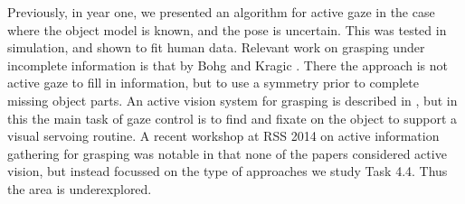 \documentclass[a4paper,11pt,pdf]{pacmanreport}
\begin{document}
Previously, in year one, we presented an algorithm for active gaze in the case where the object model is known, and the pose is uncertain. This was tested in simulation, and shown to fit human data. Relevant work on grasping under incomplete information is that by Bohg and Kragic \cite{bohg:icra11}. There the approach is not active gaze to fill in information, but to use a symmetry prior to complete missing object parts. An active vision system for grasping is described in \cite{gratal:irosws10}, but in this the main task of gaze control is to find and fixate on the object to support a visual servoing routine. A recent workshop at RSS 2014 on active information gathering for grasping was notable in that none of the papers considered active vision, but instead focussed on the type of approaches we study Task 4.4. Thus the area is underexplored.








% 



\end{document}
